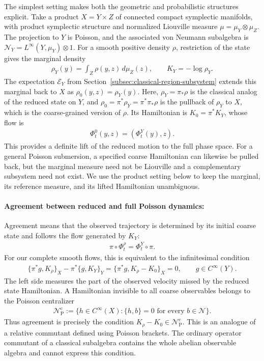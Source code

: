 \documentclass[a4paper,11pt]{article}
\theoremstyle{definition}
\newcommand{\NL}[1]{\textcolor{blue}{#1}}
\newcommand{\mE}{\mathcal{E}}
\begin{document}
The simplest setting makes both the geometric and probabilistic structures explicit. Take a product $X=Y\times Z$ of connected compact symplectic manifolds, with product symplectic structure and normalized Liouville measure $\mu=\mu_Y\otimes\mu_Z$. The projection to $Y$ is Poisson, and the associated von Neumann subalgebra is $\mathcal N_Y=L^\infty(Y,\mu_Y)\otimes1$. For a smooth positive density $\rho$, restriction of the state gives the marginal density
\begin{align}\label{eq:classical-marginal-Hamiltonian}
    \rho_Y(y)=\int_Z\rho(y,z)\,d\mu_Z(z),\qquad
    K_Y=-\log\rho_Y.
\end{align}
The expectation $\mE_Y$ from Section~\ref{subsec:classical-region-subsystem} extends this marginal back to $X$ as $\rho_0(y,z)=\rho_Y(y)$. Here, $\rho_Y=\pi_*\rho$ is the classical analog of the reduced state on $Y$, and $\rho_0=\pi^*\rho_Y=\pi^*\pi_* \rho$ is the pullback of $\rho_Y$ to $X$, which is the coarse-grained version of $\rho$. Its Hamiltonian is $K_0=\pi^*K_Y$, whose flow is
\begin{align}
    \Phi_t^0(y,z)=(\Phi_t^Y(y),z).
\end{align}
This provides a definite lift of the reduced motion to the full phase space. For a general Poisson submersion, a specified coarse Hamiltonian can likewise be pulled back, but the marginal measure need not be Liouville and a complementary subsystem need not exist. We use the product setting below to keep the marginal, its reference measure, and its lifted Hamiltonian unambiguous.



\paragraph{Agreement between reduced and full Poisson dynamics:}
Agreement means that the observed trajectory is determined by its initial coarse state and follows the flow generated by $K_Y$:
\begin{align}\label{eq:classical-state-intertwining}
    \pi\circ\Phi_t^\rho=\Phi_t^Y\circ\pi.
\end{align}
For our complete smooth flows, this is equivalent to the infinitesimal condition
\begin{align}\label{eq:classical-state-defect}
    \{\pi^*g,K_\rho\}_X-\pi^*\{g,K_Y\}_Y
    =\{\pi^*g,K_\rho-K_0\}_X=0,
    \qquad g\in C^\infty(Y).
\end{align}
The left side measures the part of the observed velocity missed by the reduced state Hamiltonian. A Hamiltonian invisible to all coarse observables belongs to the Poisson centralizer
\begin{align}
    \mathcal N^{\mathrm c}_{\mathrm P}
    :=\{h\in C^\infty(X):\{h,b\}=0\text{ for every }b\in\mathcal N\}.
\end{align}
Thus agreement is precisely the condition $K_\rho-K_0\in\mathcal N^{\mathrm c}_{\mathrm P}$. This is an analogue of a relative commutant defined using Poisson brackets. The ordinary operator commutant of a classical subalgebra contains the whole abelian observable algebra and cannot express this condition.
\end{document}
